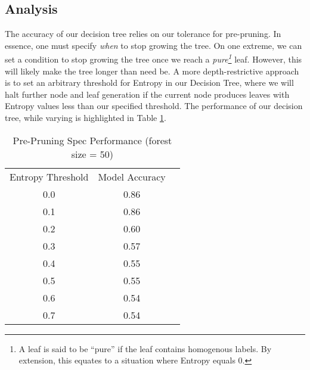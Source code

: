 \documentclass[letterpaper,12pt]{article}
\begin{document}
\subsection{Analysis}
The accuracy of our decision tree relies on our tolerance for pre-pruning.  In essence, one must specify \emph{when} to stop growing the tree.  On one extreme, we can set a condition to stop growing the tree once we reach a \emph{pure\footnote{A leaf is said to be ``pure'' if the leaf contains homogenous labels.  By extension, this equates to a situation where Entropy equals 0.}} leaf.  However, this will likely make the tree longer than need be.  A more depth-restrictive approach is to set an arbitrary threshold for Entropy in our Decision Tree, where we will halt further node and leaf generation if the current node produces leaves with Entropy values less than our specified threshold.  The performance of our decision tree, while varying  is highlighted in Table \ref{table:PrePruningTable}.

\begin{table}[htb]
  \caption{Pre-Pruning Spec Performance (forest size = 50)}
  \label{table:PrePruningTable}
  \centering
  \begin{tabular}{|c|c|c|}
  
    \hline
    \hline
    \multicolumn{1}{c}{Entropy Threshold}
    &  \multicolumn{1}{c}{Model Accuracy} \\
    \cline{1-2}
    0.0 & 0.86 \\
    \cline{1-2}
    0.1 & 0.86 \\
    \cline{1-2}
    0.2 & 0.60 \\
    \cline{1-2}
    0.3 & 0.57 \\
    \cline{1-2}
    0.4 & 0.55 \\
    \cline{1-2}
    0.5 & 0.55 \\
    \cline{1-2}
    0.6 & 0.54 \\
    \cline{1-2}
    0.7 & 0.54 \\
    
    
    \cline{1-2}
  \end{tabular}
\end{table}

\end{document}
